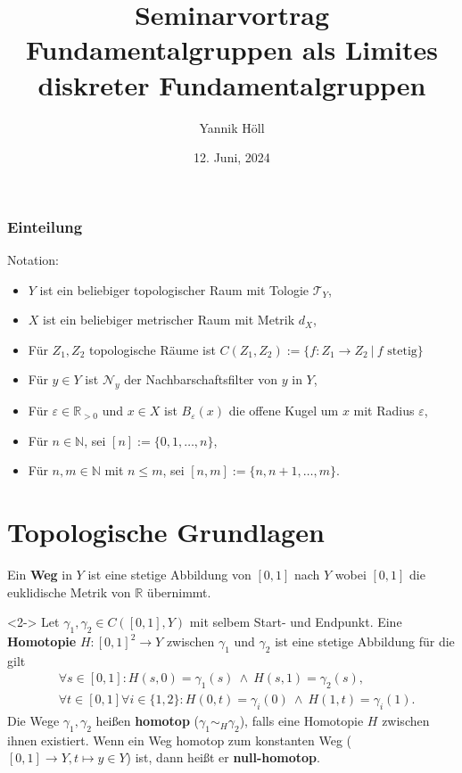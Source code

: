 \documentclass[12pt, aspectratio=169]{beamer}
\title{Seminarvortrag \\Fundamentalgruppen als Limites diskreter Fundamentalgruppen}
\author[Y. Höll]{Yannik Höll}
\date{12. Juni, 2024}
\newcommand{\R}[0]{\mathbb{R}}
\newcommand{\N}[0]{\mathbb{N}}
\newcommand{\NB}[0]{\mathcal{N}}
\begin{document}
\begin{frame}
	\titlepage
\end{frame}

\begin{frame}
	\frametitle{Einteilung}
	\tableofcontents
\end{frame}

\begin{frame}
    Notation:
        \begin{itemize}
            \item $Y$ ist ein beliebiger topologischer Raum mit Tologie $\mathcal{T}_Y$,
            \item $X$ ist ein beliebiger metrischer Raum mit Metrik $d_X$,
            \item Für $Z_1, Z_2$ topologische Räume ist $C(Z_1, Z_2) := \{f: Z_1 \to Z_2 \: | \: f \text{ stetig}\}$
            \item Für $y \in Y$ ist $\NB_y$ der Nachbarschaftsfilter von $y$ in $Y$,
            \item Für $\varepsilon \in \R_{>0}$ und $x \in X$ ist $B_{\varepsilon}(x)$ die offene Kugel um $x$ mit Radius $\varepsilon$,
            \item Für $n \in \N$, sei $[n] := \{0, 1, \ldots, n\}$,
            \item Für $n,m \in \N$ mit $n \leq m$, sei $[n,m] := \{n, n+1, \ldots, m\}$.
        \end{itemize}        
\end{frame}

\section{Topologische Grundlagen}

\begin{frame}
    \begin{definition}
        Ein \textbf{Weg} in $Y$ ist eine stetige Abbildung von $[0,1]$ nach $Y$ wobei $[0,1]$ die euklidische Metrik von $\R$ übernimmt.
    \end{definition}
    \begin{definition}<2->
         {
        Let $\gamma_1, \gamma_2 \in C([0, 1], Y)$ mit selbem Start- und Endpunkt. Eine \textbf{Homotopie} $H\colon [0,1]^2 \to Y$ zwischen $\gamma_1$ und $\gamma_2$ ist eine stetige Abbildung für die gilt
        \begin{align*}
            &\forall s \in [0,1]\colon H(s, 0) = \gamma_1(s) \: \land \: H(s, 1) = \gamma_2(s), \\
            &\forall t\in[0,1]\forall i\in \{1,2\}\colon H(0, t) = \gamma_i(0) \: \land \: H(1, t) = \gamma_i(1).
        \end{align*}
        }
         { Die Wege $\gamma_1, \gamma_2$ heißen \textbf{homotop} ($\gamma_1 \sim_H \gamma_2$), falls eine Homotopie $H$ zwischen ihnen existiert. }
         { Wenn ein Weg homotop zum konstanten Weg ($[0,1] \to Y, t \mapsto y \in Y$) ist, dann heißt er \textbf{null-homotop}.}
    \end{definition}
\end{frame}
\end{document}
